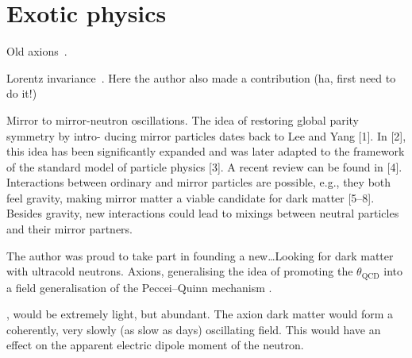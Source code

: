 \section{Exotic physics}

Old axions~\cite{Afach2015Exotic}.

Lorentz invariance~\cite{Altarev2009}. Here the author also made a contribution (ha, first need to do it!)

Mirror to mirror-neutron oscillations. The idea of restoring global parity symmetry by intro- ducing mirror particles dates back to Lee and Yang [1]. In [2], this idea has been significantly expanded and was later adapted to the framework of the standard model of particle physics [3]. A recent review can be found in [4]. Interactions between ordinary and mirror particles are possible, e.g., they both feel gravity, making mirror matter a viable candidate for dark matter [5–8]. Besides gravity, new interactions could lead to mixings between neutral particles and their mirror partners.~\cite{PhysRevD.80.032003}

The author was proud to take part in founding a new\ldots Looking for dark matter with ultracold neutrons. Axions, generalising the idea of promoting the $\theta_\text{QCD}$ into a field  generalisation of the Peccei--Quinn mechanism \cite{PhysRevLett.38.1440}.

, would be extremely light, but abundant. The axion dark matter would form a coherently, very slowly (as slow as days) oscillating field. This would have an effect on the apparent electric dipole moment of the neutron.